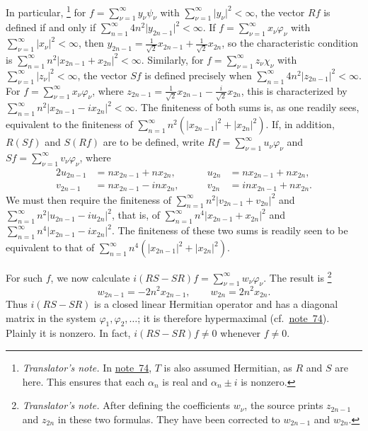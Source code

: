 \documentclass[
  paper=b5,
  twoside=true,
  fontsize=13pt,
  headings=normal,
  bookmarkpackage=false
]{scrartcl}
\theoremstyle{definition}
\newcommand{\NoteRef}[1]{\hyperref[fn:#1]{note~#1}}
\newcounter{translatornote}
\newcounter{savedfootnote}
\newcommand{\TranslatorNote}[1]{%
  \stepcounter{translatornote}%
  \setcounter{savedfootnote}{\value{footnote}}%
  \begingroup
    \renewcommand{\thefootnote}{T\arabic{translatornote}}%
    \footnote{\textit{Translator's note.} #1}%
  \endgroup
  \setcounter{footnote}{\value{savedfootnote}}}
\begin{document}
In particular,\TranslatorNote{In \NoteRef{74}, \(T\) is also assumed Hermitian, as \(R\) and \(S\) are here.
This ensures that each \(\alpha_n\) is real and \(\alpha_n\pm i\) is nonzero.} for
\(f=\sum_{\nu=1}^{\infty}y_{\nu}\psi_{\nu}\) with
\(\sum_{\nu=1}^{\infty}\lvert y_{\nu}\rvert^{2}<\infty\), the vector \(Rf\)
is defined if and only if \(\sum_{n=1}^{\infty}4n^{2}\lvert y_{2n-1}\rvert^{2}
<\infty\). If \(f=\sum_{\nu=1}^{\infty}x_{\nu}\varphi_{\nu}\) with
\(\sum_{\nu=1}^{\infty}\lvert x_{\nu}\rvert^{2}<\infty\), then
\(y_{2n-1}=\frac{1}{\sqrt2}x_{2n-1}+\frac{1}{\sqrt2}x_{2n}\), so the
characteristic condition is \(\sum_{n=1}^{\infty}n^{2}
\lvert x_{2n-1}+x_{2n}\rvert^{2}<\infty\). Similarly, for
\(f=\sum_{\nu=1}^{\infty}z_{\nu}\chi_{\nu}\) with
\(\sum_{\nu=1}^{\infty}\lvert z_{\nu}\rvert^{2}<\infty\), the vector \(Sf\) is
defined precisely when \(\sum_{n=1}^{\infty}4n^{2}\lvert z_{2n-1}\rvert^{2}
<\infty\). For \(f=\sum_{\nu=1}^{\infty}x_{\nu}\varphi_{\nu}\), where
\(z_{2n-1}=\frac{1}{\sqrt2}x_{2n-1}-\frac{i}{\sqrt2}x_{2n}\), this is
characterized by \(\sum_{n=1}^{\infty}n^{2}
\lvert x_{2n-1}-ix_{2n}\rvert^{2}<\infty\). The finiteness of both sums is,
as one readily sees, equivalent to the finiteness of
\(\sum_{n=1}^{\infty}n^{2}(\lvert x_{2n-1}\rvert^{2}
+\lvert x_{2n}\rvert^{2})\). If, in addition, \(R(Sf)\) and \(S(Rf)\) are to
be defined, write \(Rf=\sum_{\nu=1}^{\infty}u_{\nu}\varphi_{\nu}\) and
\(Sf=\sum_{\nu=1}^{\infty}v_{\nu}\varphi_{\nu}\), where
\begin{alignat*}{2}
  u_{2n-1}&=n x_{2n-1}+n x_{2n},
  &\qquad u_{2n}&=n x_{2n-1}+n x_{2n},\\
  v_{2n-1}&=n x_{2n-1}-in x_{2n},
  &\qquad v_{2n}&=in x_{2n-1}+n x_{2n}.
\end{alignat*}
We must then require the finiteness of
\(\sum_{n=1}^{\infty}n^{2}\lvert v_{2n-1}+v_{2n}\rvert^{2}\) and
\(\sum_{n=1}^{\infty}n^{2}\lvert u_{2n-1}-iu_{2n}\rvert^{2}\), that is, of
\(\sum_{n=1}^{\infty}n^{4}\lvert x_{2n-1}+x_{2n}\rvert^{2}\) and
\(\sum_{n=1}^{\infty}n^{4}\lvert x_{2n-1}-ix_{2n}\rvert^{2}\).
The finiteness of these two sums is readily seen to be equivalent to that
of \(\sum_{n=1}^{\infty}n^{4}(\lvert x_{2n-1}\rvert^{2}
+\lvert x_{2n}\rvert^{2})\).

For such \(f\), we now calculate
\(i(RS-SR)f=\sum_{\nu=1}^{\infty}w_{\nu}\varphi_{\nu}\). The result is\TranslatorNote{After defining the coefficients \(w_\nu\),
the source prints \(z_{2n-1}\) and \(z_{2n}\) in these two formulas.  They
have been corrected to \(w_{2n-1}\) and \(w_{2n}\).}
\[
  w_{2n-1}=-2n^{2}x_{2n-1},
  \qquad
  w_{2n}=2n^{2}x_{2n}.
\]
Thus \(i(RS-SR)\) is a closed linear Hermitian operator and has a
diagonal matrix in the system
\(\varphi_{1},\varphi_{2},\ldots\); it is therefore hypermaximal
(cf.\ \NoteRef{74}). Plainly it is nonzero. In fact,
\(i(RS-SR)f\neq0\) whenever \(f\neq0\).
\end{document}
